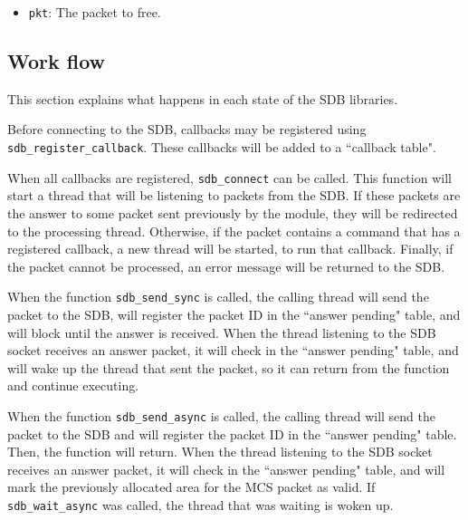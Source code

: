 \documentclass[12pt,a4paper]{report}
\begin{document}
\begin{itemize}
\item \texttt{pkt}: The packet to free.
\end{itemize}

\subsection*{Work flow}
This section explains what happens in each state of the SDB libraries.

Before connecting to the SDB, callbacks may be registered using \texttt{sdb\_register\_callback}. These callbacks will be added to a ``callback table".

When all callbacks are registered, \texttt{sdb\_connect} can be called. This function will start a thread that will be listening to packets from the SDB. If these packets are the answer to some packet sent previously by the module, they will be redirected to the processing thread. Otherwise, if the packet contains a command that has a registered callback, a new thread will be started, to run that callback. Finally, if the packet cannot be processed, an error message will be returned to the SDB.

When the function \texttt{sdb\_send\_sync} is called, the calling thread will send the packet to the SDB, will register the packet ID in the ``answer pending" table, and will block until the answer is received. When the thread listening to the SDB socket receives an answer packet, it will check in the ``answer pending" table, and will wake up the thread that sent the packet, so it can return from the function and continue executing.

When the function \texttt{sdb\_send\_async} is called, the calling thread will send the packet to the SDB and will register the packet ID in the ``answer pending" table. Then, the function will return. When the thread listening to the SDB socket receives an answer packet, it will check in the ``answer pending" table, and will mark the previously allocated area for the MCS packet as valid. If \texttt{sdb\_wait\_async} was called, the thread that was waiting is woken up.
\end{document}
